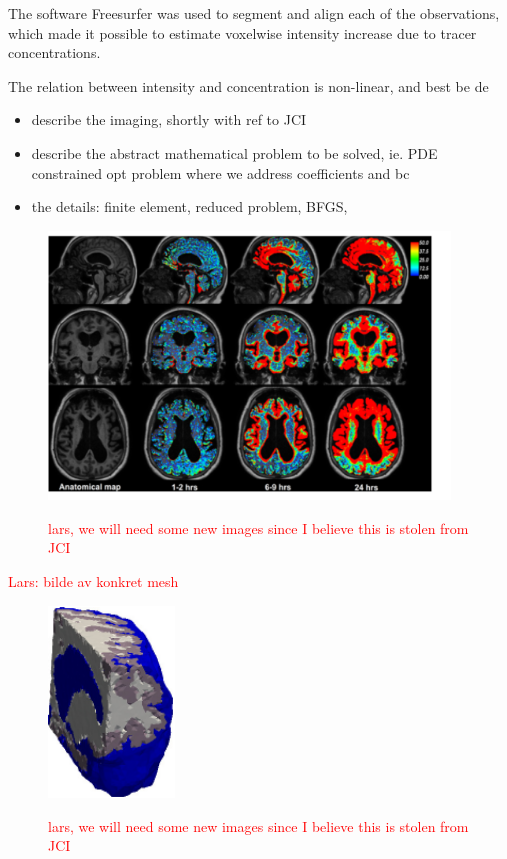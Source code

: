 \documentclass[11pt,a4paper]{article}
\renewcommand{\comment}[1]{\textcolor{red}{#1}}
\begin{document}
The software Freesurfer was used to segment and align each of the observations, which made it possible to estimate voxelwise intensity increase due to tracer concentrations. 

The relation between intensity and concentration is non-linear, and best be de


 

\begin{itemize}
\item describe the imaging, shortly with ref to JCI  
\item describe the abstract mathematical problem to be solved, ie. PDE constrained opt problem where we 
address coefficients and bc  
\item the details: finite element, reduced problem, BFGS,  
\end{itemize}

\begin{figure}
\includegraphics[width=0.95\textwidth]{GMRI.png} 
\label{fig1} 
\caption{\comment{lars, we will need some new images since I believe this is stolen from JCI}}
\end{figure}

\comment{Lars: bilde av konkret mesh  }

\begin{figure}
\includegraphics[width=0.3\textwidth]{mesh-eps-converted-to.pdf} 
\label{fig1} 
\caption{\comment{lars, we will need some new images since I believe this is stolen from JCI}}
\end{figure}
\end{document}
